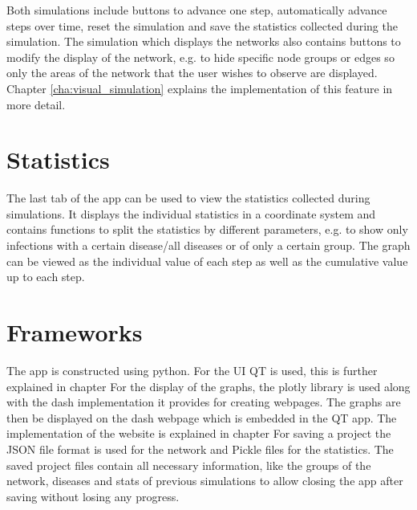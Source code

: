 Both simulations include buttons to advance one step, automatically advance steps over time,
reset the simulation and save the statistics collected during the simulation. The simulation
which displays the networks also contains buttons to modify the display of the network, e.g. to hide specific node groups or edges so only the areas of the network that the user wishes to observe are displayed.
Chapter \ref{cha:visual_simulation} explains the implementation of this feature in more detail.

\section{Statistics}
The last tab of the app can be used to view the statistics collected during simulations.
It displays the individual statistics in a coordinate system and contains functions to split
the statistics by different parameters, e.g. to show only infections with a certain disease/all
diseases or of only a certain group. The graph can be viewed as the individual value of each
step as well as the cumulative value up to each step.

\section{Frameworks}
The app is constructed using python. For the UI QT \cite{qt} is used, this is further explained
in chapter %
For the display of the graphs, the plotly \cite{plotly} library is used along with the dash implementation it provides for creating webpages. The graphs are then be displayed on the dash webpage which is embedded in the QT app. The implementation of the website is explained in chapter %
For saving a project the JSON file format is used for the network and Pickle files for the statistics. The saved project files contain all 
necessary information, like the groups of the network, diseases and stats of previous simulations
to allow closing the app after saving without losing any progress.

